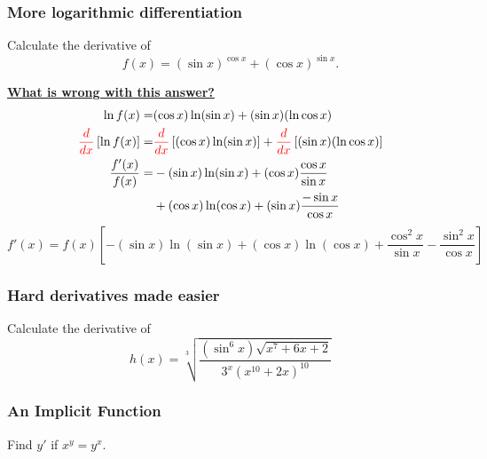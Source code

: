 \documentclass[14pt]{beamer}
\begin{document}
\begin{frame}[t]
	\fontsize{13}{13}\selectfont
	\frametitle{More logarithmic differentiation}

	\begin{block}{}
		Calculate the derivative of
		\[
			f(x) = \left( \sin x \right)^{\cos x}+ \left( \cos x \right)^{\sin x}.
		\]
	\end{block}

	\vfill

	{\bfseries \underline{What is wrong with this answer?}}
	\begin{align*}
		\ln f(x) =                                          & (\cos x) \ln ( \sin x )+ ( \sin x ) ( \ln \cos x )                                                                                   \\
		{\color{red} \frac{d}{dx}}\left[ \ln f(x) \right] = & {\color{red} \frac{d}{dx}}\left[ (\cos x) \ln ( \sin x ) \right] +{\color{red} \frac{d}{dx}}\left[ ( \sin x ) ( \ln \cos x ) \right] \\
		\frac{f'(x)}{f(x)}=                                 & - ( \sin x ) \ln (\sin x) + (\cos x ) \frac{\cos x}{\sin x}                                                                          \\
		                                                    & + ( \cos x ) \ln (\cos x) + (\sin x ) \frac{- \sin x}{\cos x}
	\end{align*}
	\[
		{f'(x) = f(x) \left[ - (\sin x) \ln(\sin x) + (\cos x) \ln (\cos x) + \frac{\cos^{2}x}{\sin x} - \frac{\sin^{2}x}{\cos x} \right]}
	\]
\end{frame}

\begin{frame}[t]
	\frametitle{Hard derivatives made easier}

	\vspace{5mm}
	\begin{block}{}
		Calculate the derivative of
		\[
			h(x) = \sqrt[3]{\frac{\left( \sin^{6}x \right) \sqrt{x^7+6x+2}}{3^{x}\left(x^{10}+2x\right)^{10}}}
		\]
	\end{block}
\end{frame}

\begin{frame}[t]
	\frametitle{An Implicit Function}

	\vspace{5mm}
	\begin{block}{}
		Find $y'$ if $x^{y}=y^{x}$.
	\end{block}
\end{frame}
\end{document}
